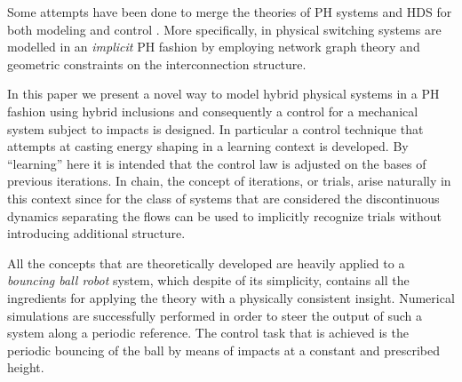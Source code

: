 {Some attempts have been done to merge the theories of PH systems and HDS for both modeling \cite{valentin2006hybrid,valentin2007port} and control \cite{haddad2003energy,5400785}. More specifically, in \cite{valentin2006hybrid,valentin2007port,5400785} physical switching systems are modelled in an \textit{implicit} PH fashion by employing network graph theory and geometric constraints on the interconnection structure. 

In this paper we present a novel way to model hybrid physical systems in a PH fashion using hybrid inclusions and consequently a control for a mechanical system subject to impacts is designed.
In particular a control technique that attempts at casting energy shaping in a learning context is developed. By ``learning'' here it is intended that the control law is adjusted on the bases of previous iterations. In chain, the concept of iterations, or trials, arise naturally in this context since for the class of systems that are considered the discontinuous dynamics separating the flows can be used to implicitly recognize trials without introducing additional structure.

All the concepts that are theoretically developed are heavily applied to a \textit{bouncing ball robot} system, which despite of its simplicity, contains all the ingredients for applying the theory with a physically consistent insight. Numerical simulations are successfully performed in order to steer the output of such a system along a periodic reference. The control task that is achieved is the periodic bouncing of the ball by means of impacts at a constant and prescribed height.

}
